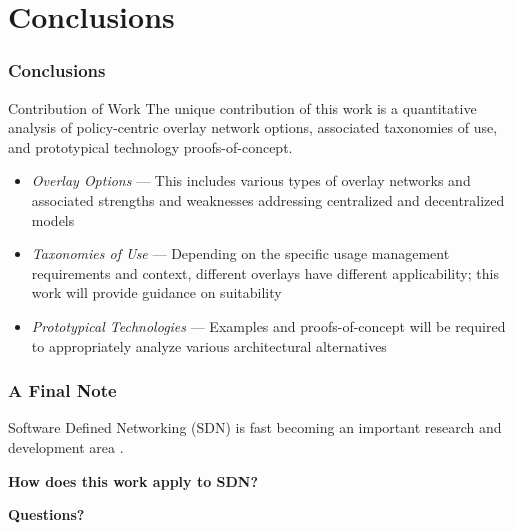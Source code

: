 \section{Conclusions}

\begin{frame}
\frametitle{Conclusions}
\begin{beamerboxesrounded}[shadow]{Contribution of Work}
The unique contribution of this work is a quantitative analysis of policy-centric overlay network options, associated taxonomies of use, and prototypical technology proofs-of-concept.
\end{beamerboxesrounded}
\begin{itemize}
\item \textit{Overlay Options} --- This includes various types of overlay networks and associated strengths and weaknesses addressing centralized and decentralized models
\item \textit{Taxonomies of Use} --- Depending on the specific usage management requirements and context, different overlays have different applicability; this work will provide guidance on suitability
\item \textit{Prototypical Technologies} --- Examples and proofs-of-concept will be required to appropriately analyze various architectural alternatives
\end{itemize}
\end{frame}

\begin{frame}
\frametitle{A Final Note}
Software Defined Networking (SDN) is fast becoming an important research and development area \cite{proposal:openflow, proposal:onf}.
\newline
\newline
\newline
\newline
\pause
\begin{center}
\textbf{How does this work apply to SDN?}
\end{center}
\end{frame}

\begin{frame}[c]
\begin{center}
\textbf{Questions?}
\end{center}
\end{frame}